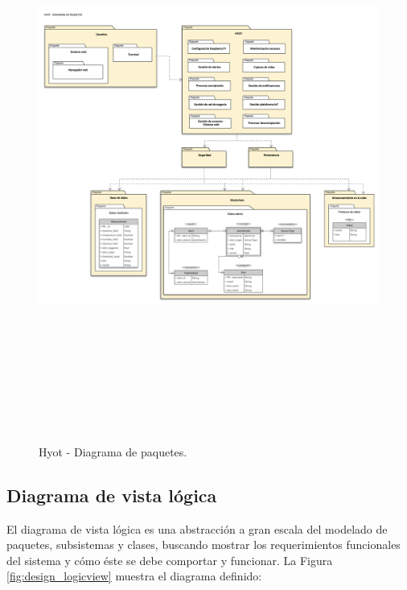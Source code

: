 \documentclass[12pt,a4paper, twoside]{report}
\begin{document}
	\begin{figure}[!ht]   
		\caption{Hyot - Diagrama de paquetes.} 
		\begin{center} 
			\includegraphics[width=18cm,height=18cm]{Images/design/d_packages} \\
			\label{fig:design_packages} 
		\end{center}  
	\end{figure}	
	
	\subsection{Diagrama de vista lógica} %
		
	El diagrama de vista lógica es una abstracción a gran escala del modelado de paquetes, subsistemas y clases, buscando mostrar los requerimientos funcionales del sistema y cómo éste se debe comportar y funcionar. La Figura \ref{fig:design_logicview} muestra el diagrama definido: \\
	
\end{document}
